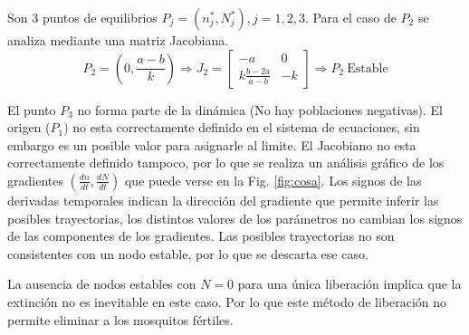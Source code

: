 \documentclass[twocolumn,aps,prl]{revtex4-1}
\newcommand{\nstar}{n^*}
\newcommand{\Nstar}{N^*}
\begin{document}
Son 3 puntos de equilibrios $P_j = (\nstar_{j},\Nstar_{j}), j= 1, 2, 3$. Para el caso de $P_2$ se analiza mediante una matriz Jacobiana.
$$
P_2 = \left( 0, \frac{a-b}{k} \right)  \Rightarrow  
J_2 = 
\begin{bmatrix}
    -a & 0  \\
    k \frac{b - 2a}{ a - b } & -k 
\end{bmatrix}
\Rightarrow  P_2 \ \text{Estable}
$$

El punto $P_3$ no forma parte de la dinámica (No hay poblaciones negativas). 
El origen ($P_1$) no esta correctamente definido en el sistema de ecuaciones, sin embargo es un posible valor para asignarle al limite. El Jacobiano no esta correctamente definido tampoco, por lo que se realiza un análisis gráfico de los gradientes $(\frac{dn}{dt}, \frac{dN}{dt})$ que puede verse en la Fig. \ref{fig:cosa}. Los signos de las derivadas temporales indican la dirección del gradiente que permite inferir las posibles trayectorias, los distintos valores de los parámetros no cambian los signos de las componentes de los gradientes. Las posibles trayectorias no son consistentes con un nodo estable, por lo que se descarta ese caso.

La ausencia de nodos estables con $N=0$ para una única liberación implica que la extinción no es inevitable en este caso. Por lo que este método de liberación no permite eliminar a los mosquitos fértiles. 
\end{document}
